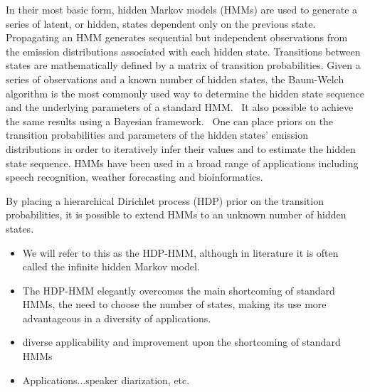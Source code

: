 \documentclass[journal=jpcbfk,manuscript=article]{achemso}
\begin{document}
  In their most basic form, hidden Markov models (HMMs) are used to generate
  a series of latent, or hidden, states dependent only on the previous state.~\cite{rabiner_tutorial_1989}
  Propagating an HMM generates sequential but independent observations from 
  the emission distributions associated with each hidden state. Transitions 
  between states are mathematically defined by a matrix of transition probabilities.
  Given a series of observations and a known number of hidden states, the 
  Baum-Welch algorithm is the most commonly used way to determine the hidden
  state sequence and the underlying parameters of a standard HMM.~\cite{baum_maximization_1970}
  It also possible to achieve the same results using a Bayesian 
  framework.~\cite{scott_bayesian_2002,jasra_markov_2005} One can place priors
  on the transition probabilities and parameters of the hidden states' emission
  distributions in order to iteratively infer their values and to estimate the hidden state
  sequence. HMMs have been used in a broad range of applications including speech
  recognition, weather forecasting and bioinformatics.~\cite{juang_on_1984,hughes_non-homogeneous_1999,yoon_hidden_2009}
  
  By placing a hierarchical Dirichlet process (HDP) prior on the transition 
  probabilities, it is possible to extend HMMs to an unknown number of hidden
  states.~\cite{teh_hierarchical_2006}
  \begin{itemize}
    \item We will refer to this as the HDP-HMM, although in literature it is 
    often called the infinite hidden Markov model.~\cite{beal_infinite_2002}
    \item The HDP-HMM elegantly overcomes the main shortcoming of standard
    HMMs, the need to choose the number of states, making its use more 
    advantageous in a diversity of applications.
    \item 
    
    diverse applicability and improvement upon the shortcoming 
    of standard HMMs
    \item Applications...speaker diarization, etc.
  \end{itemize}    
  
\end{document}
